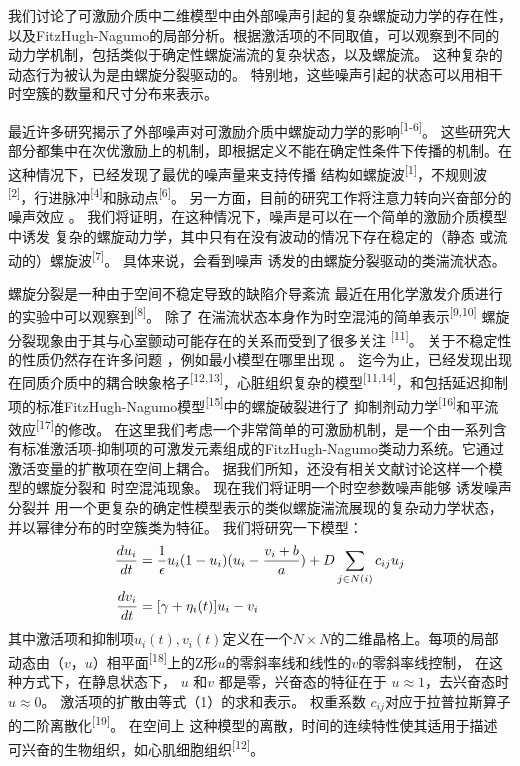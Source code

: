 \documentclass[
pdflinks,
]{xjtuthesis}
\begin{document}

\newcommand{\apcite}[1]{\textsuperscript{[#1]}}


我们讨论了可激励介质中⼆维模型中由外部噪声引起的复杂螺旋动⼒学的存在性，以及FitzHugh-Nagumo的局部分析。根据激活项的不同取值，可以观察到不同的动⼒学机制，包括类似于确定性螺旋湍流的复杂状态，以及螺旋流。 这种复杂的动态⾏为被认为是由螺旋分裂驱动的。 
特别地，这些噪声引起的状态可以⽤相⼲时空簇的数量和尺⼨分布来表示。 


最近许多研究揭⽰了外部噪声对可激励介质中螺旋动⼒学的影响\apcite{1-6}。 这些研究⼤部分都集中在次优激励上的机制，即根据定义不能在确定性条件下传播的机制。在这种情况下，已经发现了最优的噪声量来⽀持传播
结构如螺旋波\apcite{1}，不规则波\apcite{2}，⾏进脉冲\apcite{4}和脉动点\apcite{6}。
另⼀⽅⾯，⽬前的研究⼯作将注意⼒转向兴奋部分的噪声效应
。 我们将证明，在这种情况下，噪声是可以在⼀个简单的激励介质模型中诱发
复杂的螺旋动⼒学，其中只有在没有波动的情况下存在稳定的（静态
或流动的）螺旋波\apcite{7}。 具体来说，会看到噪声
诱发的由螺旋分裂驱动的类湍流状态。

\medskip

螺旋分裂是⼀种由于空间不稳定导致的缺陷介导紊流
最近在⽤化学激发介质进⾏的实验中可以观察到\apcite{8}。 除了
在湍流状态本⾝作为时空混沌的简单表⽰\apcite{9,10}
螺旋分裂现象由于其与⼼室颤动可能存在的关系⽽受到了很多关注
\apcite{11}。 关于不稳定性的性质仍然存在许多问题
，例如最⼩模型在哪里出现
。 迄今为⽌，已经发现出现在同质介质中的耦合映象格子\apcite{12,13}，⼼脏组织复杂的模型\apcite{11,14}，和包括延迟抑制项的标准FitzHugh-Nagumo模型\apcite{15}中的螺旋破裂进⾏了
抑制剂动⼒学\apcite{16}和平流效应\apcite{17}的修改。 在这⾥我们考虑⼀个⾮常简单的可激励机制，是一个由⼀系列含有标准激活项-抑制项的可激发元素组成的FitzHugh-Nagumo类动⼒系统。它通过激活变量的扩散项在空间上耦合。
据我们所知，还没有相关文献讨论这样⼀个模型的螺旋分裂和
时空混沌现象。 现在我们将证明⼀个时空参数噪声能够
诱发噪声分裂并
用一个更复杂的确定性模型表示的类似螺旋湍流展现的复杂动⼒学状态，并以幂律分布的时空簇类为特征。
\medskip
我们将研究一下模型：
\begin{align}
\dfrac{du_i}{dt}&=\dfrac{1}{\epsilon}u_i(1-u_i)(u_i-\dfrac{v_i+b}{a})+D\sum_{j \in N(i)}c_{ij}u_j\\
\notag \dfrac{dv_i}{dt}&=[\gamma+\eta_i(t)]u_i-v_i
\end{align}
其中激活项和抑制项$u_i(t),v_i(t)$定义在一个$N\times N$的二维晶格上。每项的局部动态由$（ v，u ）$相平⾯\apcite{18}上的Z形$u$的零斜率线和线性的$v$的零斜率线控制，
在这种⽅式下，在静息状态下， $u$ 和$v$ 都是零，兴奋态的特征在于
$u \approx 1$，去兴奋态时$u \approx 0$。 激活项的扩散由等式（1）的求和表示。 权重系数
$c_{ij}$对应于拉普拉斯算⼦的⼆阶离散化\apcite{19}。 在空间上
这种模型的离散，时间的连续特性使其适⽤于描述
可兴奋的⽣物组织，如⼼肌细胞组织\apcite{12}。
\end{document}
